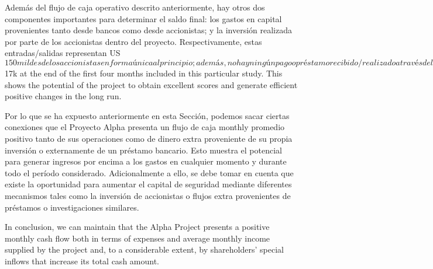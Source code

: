 Además del flujo de caja operativo descrito anteriormente, hay otros dos componentes importantes para determinar el saldo final: los gastos en capital provenientes tanto desde bancos como desde accionistas; y la inversión realizada por parte de los accionistas dentro del proyecto. Respectivamente, estas entradas/salidas representan US$150 mil desde los accionistas en forma única al principio; además, no hay ningún pago o préstamo recibido/realizado a través del banco durante este periodo, lo que significa que no hay ningún movimiento para este concepto en particular durante este primer año de desarrollo del proyecto Alpha.

                Finally, due to all these elements, the cash balance increased constantly and positively reaching the final value of US$17k at the end of the first four months included in this particular study. This shows the potential of the project to obtain excellent scores and generate efficient positive changes in the long run.

Por lo que se ha expuesto anteriormente en esta Sección, podemos sacar ciertas conexiones que el Proyecto Alpha presenta un flujo de caja monthly promedio positivo tanto de sus operaciones como de dinero extra proveniente de su propia inversión o externamente de un préstamo bancario. Esto muestra el potencial para generar ingresos por encima a los gastos en cualquier momento y durante todo el período considerado. Adicionalmente a ello, se debe tomar en cuenta que existe la oportunidad para aumentar el capital de seguridad mediante diferentes mecanismos tales como la inversión de accionistas o flujos extra provenientes de préstamos o investigaciones similares.

                In conclusion, we can maintain that the Alpha Project presents a positive monthly cash flow both in terms of expenses and average monthly income supplied by the project and, to a considerable extent, by shareholders' special inflows that increase its total cash amount.
